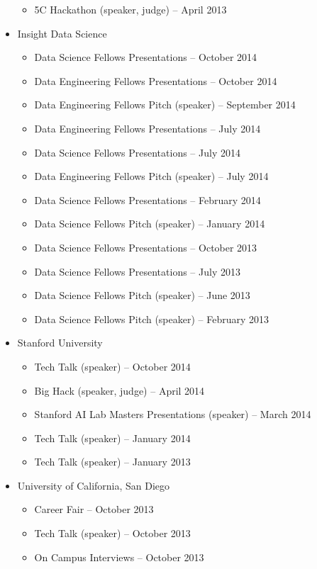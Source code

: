 \documentclass[letterpaper,11pt]{article}
\begin{document}
\begin{itemize}
\begin{itemize}
        \item 5C Hackathon (speaker, judge) -- April 2013
    \end{itemize}
\item
    Insight Data Science
    \begin{itemize}
        \item Data Science Fellows Presentations -- October 2014
        \item Data Engineering Fellows Presentations -- October 2014
        \item Data Engineering Fellows Pitch (speaker) -- September 2014
        \item Data Engineering Fellows Presentations -- July 2014
        \item Data Science Fellows Presentations -- July 2014
        \item Data Engineering Fellows Pitch (speaker) -- July 2014
        \item Data Science Fellows Presentations -- February 2014
        \item Data Science Fellows Pitch (speaker) -- January 2014
        \item Data Science Fellows Presentations -- October 2013
        \item Data Science Fellows Presentations -- July 2013
        \item Data Science Fellows Pitch (speaker) -- June 2013
        \item Data Science Fellows Pitch (speaker) -- February 2013
    \end{itemize}
\item
	Stanford University
	\begin{itemize}
		\item Tech Talk (speaker) -- October 2014
		\item Big Hack (speaker, judge) -- April 2014
		\item Stanford AI Lab Masters Presentations (speaker) -- March 2014
		\item Tech Talk (speaker) -- January 2014
		\item Tech Talk (speaker) -- January 2013
	\end{itemize}
\item
	University of California, San Diego
	\begin{itemize}
		\item Career Fair -- October 2013
		\item Tech Talk (speaker) -- October 2013
		\item On Campus Interviews -- October 2013

\end{itemize}
\end{itemize}
\end{document}
